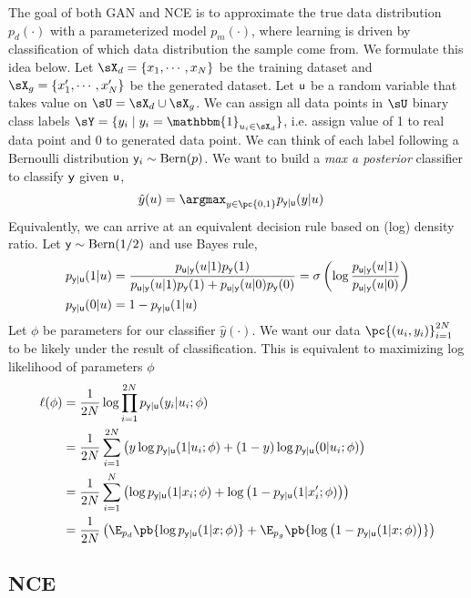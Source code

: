\documentclass[11pt]{article}
\begin{document}
The goal of both GAN and NCE is to approximate the true data distribution $p_d(\cdot)$ with a parameterized model $p_m(\cdot)$, where learning is driven by classification of which data distribution the sample come from. We formulate this idea below. Let $\sX_d = \{x_1,\cdots,x_N\}$ be the training dataset and $\sX_g = \{x_1',\cdots,x_N'\}$ be the generated dataset. Let $\mathsf{u}$ be a random variable that takes value on $\sU = \sX_d\cup \sX_g$. We can assign all data points in $\sU$ binary class labels $\sY = \{y_i \mid y_i = \mathbbm{1}_{u_i\in \sX_d} \}$, i.e. assign value of 1 to real data point and 0 to generated data point. We can think of each label following a Bernoulli distribution $\mathsf{y}_i\sim\text{Bern}(p)$. We want to build a \textit{max a posterior} classifier to classify $\mathsf{y}$ given $\mathsf{u}$,
\begin{align*}
    \hat{y}(u) 
        &= \argmax_{y\in\pc{0,1}} p_{\ry|\ru}(y|u)
\end{align*}
Equivalently, we can arrive at an equivalent decision rule based on (log) density ratio. Let $\mathsf{y}\sim\text{Bern}(1/2)$ and use Bayes rule,
\begin{align*}
    p_{\mathsf{y}|\mathsf{u}}(1|u)
        &= \frac{ p_{\mathsf{u}|\mathsf{y}}(u|1)p_{\mathsf{y}}(1) }{ p_{\mathsf{u}|\mathsf{y}}(u|1)p_{\mathsf{y}}(1) + p_{\mathsf{u}|\mathsf{y}}(u|0)p_{\mathsf{y}}(0) } 
        = \sigma\left(
            \log \frac{ p_{\mathsf{u}|\mathsf{y}}(u|1) }{ p_{\mathsf{u}|\mathsf{y}}(u|0) }
        \right) \\
    p_{\mathsf{y}|\mathsf{u}}(0|u)
        &= 1 - p_{\mathsf{y}|\mathsf{u}}(1|u)
\end{align*}
Let $\phi$ be parameters for our classifier $\hat{y}(\cdot)$. We want our data $\pc{(u_i,y_i)}_{i=1}^{2N}$ to be likely under the result of classification. This is equivalent to maximizing log likelihood of parameters $\phi$
\begin{align}
    \label{eq:1}
    \ell(\phi)
        &= \frac{1}{2N} \log \prod_{i=1}^{2N} p_{\ry|\ru}(y_i|u_i;\phi) \notag \\
        &= \frac{1}{2N} \sum_{i=1}^{2N}\left(  y\log p_{\ry|\ru}(1|u_i;\phi) + (1-y) \log p_{\ry|\ru}(0|u_i;\phi) \right) \notag\\
        &= \frac{1}{2N} \sum_{i=1}^{N} \left(  \log p_{\ry|\ru}(1|x_i;\phi) + \log \left( 1- p_{\ry|\ru}(1|x_i';\phi) \right)  \right) \notag\\
        &= \frac{1}{2N} \left( \E_{p_d}\pb{ \log p_{\ry|\ru}(1|x;\phi) } +  \E_{p_g}\pb{ \log \left( 1- p_{\ry|\ru}(1|x;\phi) \right) } \right)
\end{align}

\subsection{NCE}
\end{document}

